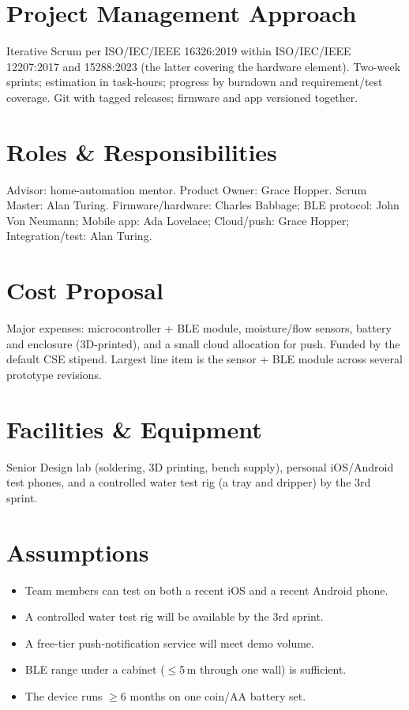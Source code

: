 \documentclass[11pt,letterpaper]{article}
\begin{document}
\section{Project Management Approach}
Iterative Scrum \cite{Rubin2012, SchwaberSutherland2020} per ISO/IEC/IEEE 16326:2019
\cite{ISO16326} within ISO/IEC/IEEE 12207:2017 \cite{ISO12207} and 15288:2023
\cite{ISO15288} (the latter covering the hardware element). Two-week sprints;
estimation in task-hours; progress by burndown and requirement/test coverage. Git
with tagged releases; firmware and app versioned together.

\section{Roles \& Responsibilities}
Advisor: home-automation mentor. Product Owner: Grace Hopper. Scrum Master: Alan
Turing. Firmware/hardware: Charles Babbage; BLE protocol: John Von Neumann; Mobile
app: Ada Lovelace; Cloud/push: Grace Hopper; Integration/test: Alan Turing.

\section{Cost Proposal}
Major expenses: microcontroller + BLE module, moisture/flow sensors, battery and
enclosure (3D-printed), and a small cloud allocation for push. Funded by the default
CSE stipend. Largest line item is the sensor + BLE module across several prototype
revisions.

\section{Facilities \& Equipment}
Senior Design lab (soldering, 3D printing, bench supply), personal iOS/Android test
phones, and a controlled water test rig (a tray and dripper) by the 3rd sprint.

\section{Assumptions}
\begin{itemize}
  \item Team members can test on both a recent iOS and a recent Android phone.
  \item A controlled water test rig will be available by the 3rd sprint.
  \item A free-tier push-notification service will meet demo volume.
  \item BLE range under a cabinet ($\leq$5\,m through one wall) is sufficient.
  \item The device runs $\geq$6 months on one coin/AA battery set.
\end{itemize}
\end{document}
